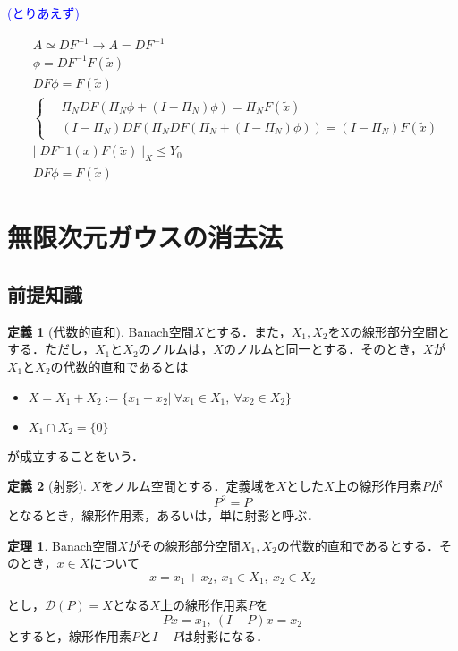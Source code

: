 \documentclass[11pt,a4paper]{jsarticle}
\theoremstyle{definition}
\newtheorem{dfn}{定義}
\newtheorem{thm}{定理}
\begin{document}
\textcolor{blue}{(とりあえず)}

\begin{align*}
   & A \simeq DF^{-1} \rightarrow A = DF^{-1} \\
   & \phi = DF^{-1}F(\tilde{x})               \\
   & DF\phi = F(\tilde{x})                    \\
   & \left\{ \,
  \begin{aligned}
     & \Pi_N DF ( \Pi_N \phi + (I-\Pi_N) \phi ) = \Pi_N F(\tilde{x})             \\
     & (I-\Pi_N) DF (\Pi_N DF (\Pi_N + (I-\Pi_N) \phi)) = (I-\Pi_N) F(\tilde{x})
  \end{aligned}
  \right.                                     \\
   & ||DF^-1(x)F(\tilde{x})||_X \leq Y_0\\
   & DF \phi = F(\tilde{x})
\end{align*}

\section{無限次元ガウスの消去法}
\subsection{前提知識}

\begin{dfn}[代数的直和]
  Banach空間$X$とする．また，$X_1,X_2$をXの線形部分空間とする．ただし，$X_1$と$X_2$のノルムは，$X$のノルムと同一とする．そのとき，$X$が$X_1$と$X_2$の代数的直和であるとは
  \begin{itemize}
    \item $X=X_1+X_2:=\{x_1+x_2 | \  \forall x_1 \in X_1, \ \forall x_2 \in X_2 \}$
    \item $X_1 \cap X_2 = \{0\}$
  \end{itemize}
  が成立することをいう．
\end{dfn}

\begin{dfn}[射影]
  $X$をノルム空間とする．定義域を$X$とした$X$上の線形作用素$P$が
  \begin{equation*}
    P^2=P
  \end{equation*}
  となるとき，線形作用素，あるいは，単に射影と呼ぶ．
\end{dfn}

\begin{thm}
  Banach空間$X$がその線形部分空間$X_1,X_2$の代数的直和であるとする．そのとき，$x\in X$について
  \begin{equation*}
    x=x_1+x_2,\ x_1 \in X_1,\ x_2 \in X_2
  \end{equation*}
\end{thm}
とし，$\mathcal{D}(P)=X$となる$X$上の線形作用素$P$を
\begin{equation*}
  Px=x_1,\ (I-P)x=x_2
\end{equation*}
とすると，線形作用素$P$と$I-P$は射影になる．
\end{document}
